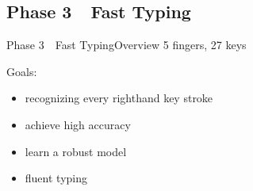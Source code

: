 \subsection{Phase 3~\textendash{}~Fast Typing}
\begin{frame}[fragile]{Phase 3~\textendash{}~Fast Typing}{Overview}
    5 fingers, 27 keys

    \pause
    \vspace{2em}
    Goals:
    \begin{itemize}
        \item recognizing every righthand key stroke
        \item achieve high accuracy
        \item learn a robust model
        \item fluent typing
    \end{itemize}

\end{frame}
